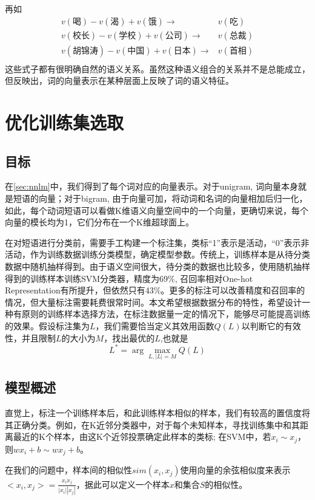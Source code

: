 再如
\begin{align*}
	v(\text{喝}) - v(\text{渴}) + v(\text{饿}) \rightarrow & v(\text{吃}) \\
	v(\text{校长}) - v(\text{学校}) + v(\text{公司}) \rightarrow & v(\text{总裁}) \\
	v(\text{胡锦涛}) - v(\text{中国}) + v(\text{日本}) \rightarrow & v(\text{首相}) \\
\end{align*}
这些式子都有很明确自然的语义关系。虽然这种语义组合的关系并不是总能成立，但反映出，词的向量表示在某种层面上反映了词的语义特征。

\section{优化训练集选取}
\label{sec:opt_trainset}
\subsection{目标}
在\ref{sec:nnlm}中，我们得到了每个词对应的向量表示。对于unigram, 词向量本身就是短语的向量；对于bigram, 由于向量可加，将动词和名词的向量相加后归一化，如此，每个动词短语可以看做K维语义向量空间中的一个向量，更确切来说，每个向量的模长均为1，它们分布在一个K维超球面上。

在对短语进行分类前，需要手工构建一个标注集，类标``1''表示是活动，``0''表示非活动，作为训练数据训练分类模型，确定模型参数。传统上，训练样本是从待分类数据中随机抽样得到。由于语义空间很大，待分类的数据也比较多，使用随机抽样得到的训练样本训练SVM分类器，精度为69\%, 召回率相对One-hot Representation有所提升，但依然只有43\%。更多的标注可以改善精度和召回率的情况，但大量标注需要耗费很常时间。本文希望根据数据分布的特性，希望设计一种有原则的训练样本选择方法，在标注数据量一定的情况下，能够尽可能提高训练的效果。假设标注集为$L$，我们需要恰当定义其效用函数$Q(L)$以判断它的有效性，并且限制$L$的大小为$M$，找出最优的$L$,也就是
\[
    L^* = \arg\max_{L,|L| = M} Q(L)
\]

\subsection{模型概述}
直觉上，标注一个训练样本后，和此训练样本相似的样本，我们有较高的置信度将其正确分类。例如，在K近邻分类器中，对于每个未知样本，寻找训练集中和其距离最近的K个样本，由这K个近邻投票确定此样本的类标; 在SVM中，若$x_i \sim x_j$，则$wx_i+b \sim wx_j+b$。

在我们的问题中，样本间的相似性$sim(x_i, x_j)$使用向量的余弦相似度来表示$<x_i, x_j>=\frac{x_i\dot x_j}{|x_i||x_j|}$，据此可以定义一个样本$x$和集合$S$的相似性。

